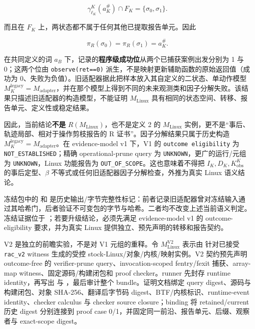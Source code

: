 \documentclass[
  11pt,
  a4paper,
]{ctexart}
\begin{document}
\[\gamma^K_{\ell_K}(a_K^\#)\cap F_K
=\{\sigma_0,\sigma_1\}.\]

而且在 \(F_K\) 上，两状态都不属于任何其他已提取报告单元。因此

\[\pi_R(\sigma_0)=\pi_R(\sigma_1)=a_K^\#.\]

在共同定义的词 \(a_B\)
下，记录的\textbf{程序级成功位}从两个已捕获案例出发分别为 1 与
0；这两个位由 \texttt{observe(ret==0)}
派生，不是映射更新辅助函数的原始返回值（成功为
0、失败为负值）。旧适配器据此把样本放入其自定义的二状态、单动作模型
\(M_K^{\mathrm{legacy}}=M_{\mathrm{adapter}}\)，并在那个模型上得到不同的未来观测类和因子分解失败。该结果只描述旧适配器的构造模型，不能证明
\(M_{\mathrm{Linux}}\)
具有相同的状态空间、转移、报告单元、定义性或稳定结果。

因此，当前结论\textbf{不是} \(R(M_{\mathrm{Linux}})\)，也不是定义 2 的
\(M_{\mathrm{Linux}}\)
实例，更不是``事后、轨迹局部、相对于操作剪枝报告的 R
证书''。因子分解结果只属于历史构造
\(M_K^{\mathrm{legacy}}=M_{\mathrm{adapter}}\)。在 evidence-model v1
下，V1 的 \texttt{outcome\ eligibility} 为
\texttt{NOT\_ESTABLISHED}；精确 operational-prune query 为
\texttt{UNKNOWN}，更广的运行/元组为 \texttt{UNKNOWN}，Linux 功能报告为
\texttt{OUT\_OF\_SCOPE}。这也意味着不得把 \(I_K,D_K,K^K_{\mathrm{obs}}\)
的事后定型、\(\beta\) 不等式或任何旧适配器因子分解检查，外推为真实 Linux
语义结论。

冻结包中的  和
是历史输出/字节完整性标记：前者记录旧适配器曾对冻结输入通过其哈希门，后者验证不可变包的字节与哈希。二者均不改变上述当前语义判定。冻结证据位于
；若要升级结论，必须先满足
evidence-model v1 的 outcome-eligibility 要求，并为真实 Linux
提供独立、预先声明的转移和报告契约。

V2 是独立的前瞻实验，不是对 V1 元组的重释。令
\(M_{\mathrm{Linux}}^{\mathrm{V2}}\) 表示由
针对已接受 \texttt{rac\_v2} witness 生成的受控
stock-Linux/对象/内核/映射实例。V2 契约预先声明 outcome-free 的
verifier-prune query、invocation-scoped fentry/fexit 捕获、array-map
witness、固定源码/构建闭包和 proof checker。runner 先封存 runtime
identity，再写出  与
，最后审计整个
bundle。证明文档绑定 query digest、源码与构建闭包、对象
SHA-256、翻译后字节码 digest、BTF/内核标识、runtime-event
identity、checker calculus 与 checker source closure；binding 将
retained/current 历史 digest 分别连接到 proof case
0/1，并固定同一前沿、报告单元、后缀、观察者与 exact-scope digest。
\end{document}
